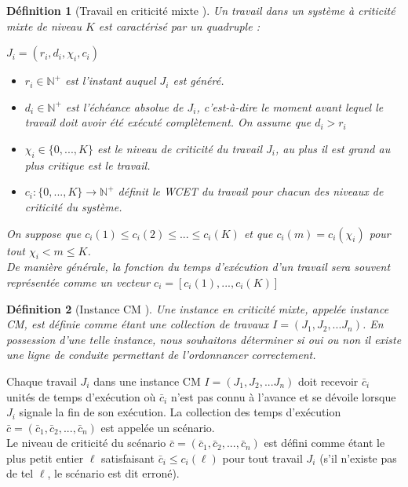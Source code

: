 \documentclass[11pt,a4paper,oneside]{book}
\theoremstyle{break}
\newtheorem{defin}{Définition}
\theoremstyle{breakplain}
\begin{document}
\begin{defin}[Travail en criticité mixte \cite{BaruahBDMSS11}]
Un travail dans un système à criticité mixte de niveau $K$ est caractérisé par un quadruple : 
\begin{center}
 $J_i = (r_i, d_i, \chi_i, c_i)$ 
\end{center}
\begin{itemize}
\item $r_i \in \mathbb{N}^{+}$ est l'instant auquel $J_i$ est généré.
\item $d_i \in \mathbb{N}^{+}$ est l'échéance absolue de $J_i$, c'est-à-dire le moment avant lequel le travail doit avoir été exécuté complètement. On assume que $d_i > r_i$
\item $\chi_i \in \{0, ..., K\}$ est le niveau de criticité du travail $J_i$, au plus il est grand au plus critique est le travail.
\item $c_i : \{0, ..., K\} \rightarrow \mathbb{N}^{+}$ définit le WCET du travail pour chacun des niveaux de criticité du système.
\end{itemize}
On suppose que $c_i(1) \leq c_i(2) \leq ... \leq c_i(K)$ et que $c_i(m) = c_i(\chi_i)$ pour tout $\chi_i < m \leq K$.\\
De manière générale, la fonction du temps d'exécution d'un travail sera souvent représentée comme un vecteur $c_i = [c_i(1), ..., c_i(K)]$
\end{defin}

\begin{defin}[Instance CM \cite{baruah2010towards}]
Une instance en criticité mixte, appelée instance CM, est définie comme étant une collection de travaux $I = (J_1, J_2, ... J_n)$. En possession d'une telle instance, nous souhaitons déterminer si oui ou non il existe une ligne de conduite permettant de l'ordonnancer correctement.
\end{defin}

Chaque travail $J_i$ dans une instance CM $I = (J_1, J_2, ... J_n)$ doit recevoir $\bar{c}_i$ unités de temps d'exécution où $\bar{c}_i$ n'est pas connu à l'avance et se dévoile lorsque $J_i$ signale la fin de son exécution. La collection des temps d'exécution $\bar{c} = (\bar{c}_1, \bar{c}_2, ..., \bar{c}_n)$ est appelée un scénario.\\

Le niveau de criticité du scénario $\bar{c} = (\bar{c}_1, \bar{c}_2, ..., \bar{c}_n)$ est défini comme étant le plus petit entier $\ell$ satisfaisant $\bar{c}_i \leq c_i(\ell)$ pour tout travail $J_i$ (s'il n'existe pas de tel $\ell$, le scénario est dit erroné).\\
\end{document}
